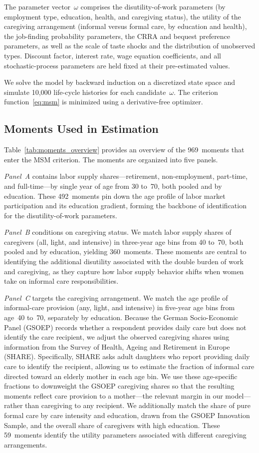 The parameter vector~$\omega$ comprises the disutility-of-work parameters
(by employment type, education, health, and caregiving status), the utility
of the caregiving arrangement (informal versus formal care, by education
and health), the job-finding probability parameters, the CRRA and bequest
preference parameters, as well as the scale of taste shocks and the
distribution of unobserved types.  Discount factor, interest rate, wage
equation coefficients, and all stochastic-process parameters are held fixed
at their pre-estimated values.

We solve the model by backward induction on a discretized state space and
simulate 10{,}000 life-cycle histories for each candidate~$\omega$.  The
criterion function~\eqref{eq:msm} is minimized using a derivative-free
optimizer.


\subsection{Moments Used in Estimation}
\label{sec:moments}

Table~\ref{tab:moments_overview} provides an overview of the 969~moments
that enter the MSM criterion.  The moments are organized into five panels.

\textit{Panel~A} contains labor supply shares---retirement, non-employment,
part-time, and full-time---by single year of age from 30 to~70, both pooled
and by education.  These 492~moments pin down the age profile of labor
market participation and its education gradient, forming the backbone of
identification for the disutility-of-work parameters.

\textit{Panel~B} conditions on caregiving status.  We match labor supply
shares of caregivers (all, light, and intensive) in three-year age bins from
40 to~70, both pooled and by education, yielding 360~moments.  These moments
are central to identifying the additional disutility associated with the
double burden of work and caregiving, as they capture how labor supply
behavior shifts when women take on informal care responsibilities.

\textit{Panel~C} targets the caregiving arrangement.  We match the age
profile of informal-care provision (any, light, and intensive) in five-year
age bins from age~40 to~70, separately by education.  Because the German
Socio-Economic Panel (GSOEP) records whether a respondent provides daily
care but does not identify the care recipient, we adjust the observed
caregiving shares using information from the Survey of Health, Ageing and
Retirement in Europe (SHARE).  Specifically, SHARE asks adult daughters
who report providing daily care to identify the recipient, allowing us to
estimate the fraction of informal care directed toward an elderly mother
in each age bin.  We use these age-specific fractions to downweight the
GSOEP caregiving shares so that the resulting moments reflect care
provision to a mother---the relevant margin in our model---rather than
caregiving to any recipient.  We additionally match the share of pure
formal care by care intensity and education, drawn from the GSOEP Innovation
Sample, and the overall share of caregivers with high education.  These
59~moments identify the utility parameters associated with different
caregiving arrangements.

